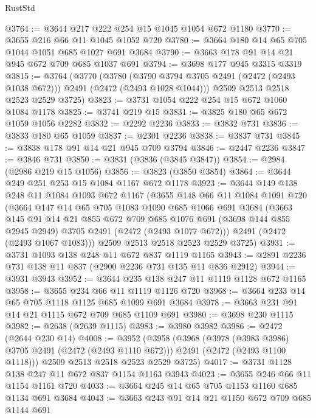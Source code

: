 \begin{lexlean}{RustStd}
\begin{coremodule}
@3764 := @3644 @217 @222 @254 @15 @1045 @1054 @672 @1180
@3770 := @3655 @216 @66 @11 @1045 @1052 @720
@3780 := @3664 @180 @14 @65 @705 @1044 @1051 @685 @1027 @691 @3684
@3790 := @3663 @178 @91 @14 @21 @945 @672 @709 @685 @1037 @691
@3794 := @3698 @177 @945 @3315 @3319
@3815 := @3764
    (@3770
      (@3780 (@3790 @3794 @3705 @2491 (@2472 (@2493 @1038 @672))) @2491 (@2472 (@2493 @1028 @1044)))
      @2509
      @2513
      @2518
      @2523
      @2529
      @3725)
@3823 := @3731 @1054 @222 @254 @15 @672 @1060 @1084 @1178
@3825 := @3741 @219 @15
@3831 := @3825 @180 @65 @672 @1059 @1056 @2282
@3832 := @2292 @2236
@3833 := @3832 @731
@3836 := @3833 @180 @65 @1059
@3837 := @2301 @2236
@3838 := @3837 @731
@3845 := @3838 @178 @91 @14 @21 @945 @709 @3794
@3846 := @2447 @2236
@3847 := @3846 @731
@3850 := @3831 (@3836 (@3845 @3847))
@3854 := @2984 (@2986 @219 @15 @1056)
@3856 := @3823 (@3850 @3854)
@3864 := @3644 @249 @251 @253 @15 @1084 @1167 @672 @1178
@3923 := @3644
    @149
    @138
    @248
    @11
    @1084
    @1093
    @672
    @1167
    (@3655
      @148
      @66
      @11
      @1084
      @1091
      @720
      (@3664
        @147
        @14
        @65
        @705
        @1083
        @1090
        @685
        @1066
        @691
        @3684
        (@3663
          @145
          @91
          @14
          @21
          @855
          @672
          @709
          @685
          @1076
          @691
          (@3698 @144 @855 @2945 @2949)
          @3705
          @2491
          (@2472 (@2493 @1077 @672)))
        @2491
        (@2472 (@2493 @1067 @1083)))
      @2509
      @2513
      @2518
      @2523
      @2529
      @3725)
@3931 := @3731 @1093 @138 @248 @11 @672 @837 @1119 @1165
@3943 := @2891 @2236 @731 @138 @11 @837 (@2900 @2236 @731 @135 @11 @836 @2912)
@3944 := @3931 @3943
@3952 := @3644 @235 @138 @247 @11 @1119 @1128 @672 @1165
@3958 := @3655 @234 @66 @11 @1119 @1126 @720
@3968 := @3664 @233 @14 @65 @705 @1118 @1125 @685 @1099 @691 @3684
@3978 := @3663 @231 @91 @14 @21 @1115 @672 @709 @685 @1109 @691
@3980 := @3698 @230 @1115
@3982 := @2638 (@2639 @1115)
@3983 := @3980 @3982
@3986 := @2472 (@2644 @230 @14)
@4008 := @3952
    (@3958
      (@3968
        (@3978 (@3983 @3986) @3705 @2491 (@2472 (@2493 @1110 @672)))
        @2491
        (@2472 (@2493 @1100 @1118)))
      @2509
      @2513
      @2518
      @2523
      @2529
      @3725)
@4017 := @3731 @1128 @138 @247 @11 @672 @837 @1154 @1163 @3943
@4023 := @3655 @246 @66 @11 @1154 @1161 @720
@4033 := @3664 @245 @14 @65 @705 @1153 @1160 @685 @1134 @691 @3684
@4043 := @3663 @243 @91 @14 @21 @1150 @672 @709 @685 @1144 @691

\end{coremodule}
\end{lexlean}

